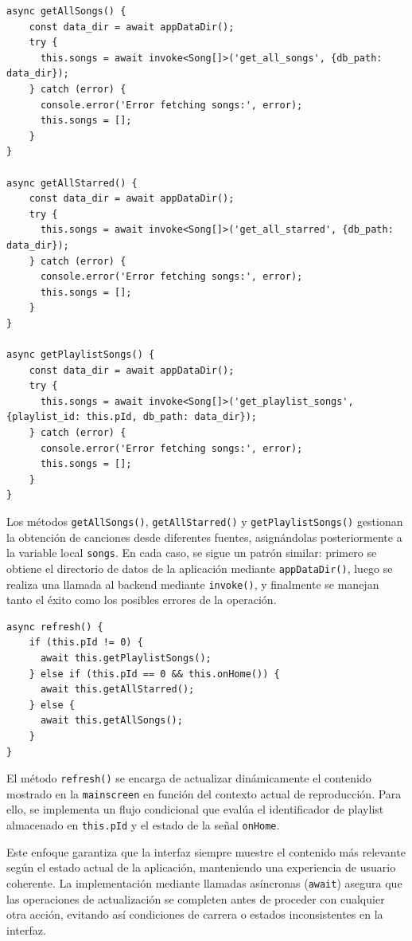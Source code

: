 \documentclass[11pt, a4paper]{article}
\begin{document}
                \begin{lstlisting}[caption={Obtención de playlists}]
async getAllSongs() {
    const data_dir = await appDataDir();
    try {
      this.songs = await invoke<Song[]>('get_all_songs', {db_path: data_dir});
    } catch (error) {
      console.error('Error fetching songs:', error);
      this.songs = [];
    }
}

async getAllStarred() {
    const data_dir = await appDataDir();
    try {
      this.songs = await invoke<Song[]>('get_all_starred', {db_path: data_dir});
    } catch (error) {
      console.error('Error fetching songs:', error);
      this.songs = [];
    }
}

async getPlaylistSongs() {
    const data_dir = await appDataDir();
    try {
      this.songs = await invoke<Song[]>('get_playlist_songs', {playlist_id: this.pId, db_path: data_dir});
    } catch (error) {
      console.error('Error fetching songs:', error);
      this.songs = [];
    }
}
                \end{lstlisting}

                Los métodos \verb|getAllSongs()|, \verb|getAllStarred()| y \verb|getPlaylistSongs()| gestionan la obtención de canciones desde diferentes fuentes, asignándolas posteriormente a la variable local \verb|songs|. En cada caso, se sigue un patrón similar: primero se obtiene el directorio de datos de la aplicación mediante \verb|appDataDir()|, luego se realiza una llamada al backend mediante \verb|invoke()|, y finalmente se manejan tanto el éxito como los posibles errores de la operación.

                \begin{lstlisting}[caption={refresh()}]
async refresh() {
    if (this.pId != 0) {
      await this.getPlaylistSongs();
    } else if (this.pId == 0 && this.onHome()) {
      await this.getAllStarred();
    } else {
      await this.getAllSongs();
    }
}
                \end{lstlisting}

                El método \verb|refresh()| se encarga de actualizar dinámicamente el contenido mostrado en la \verb|mainscreen| en función del contexto actual de reproducción. Para ello, se implementa un flujo condicional que evalúa el identificador de playlist almacenado en \verb|this.pId| y el estado de la señal \verb|onHome|.

                Este enfoque garantiza que la interfaz siempre muestre el contenido más relevante según el estado actual de la aplicación, manteniendo una experiencia de usuario coherente. La implementación mediante llamadas asíncronas (\verb|await|) asegura que las operaciones de actualización se completen antes de proceder con cualquier otra acción, evitando así condiciones de carrera o estados inconsistentes en la interfaz.
\end{document}
